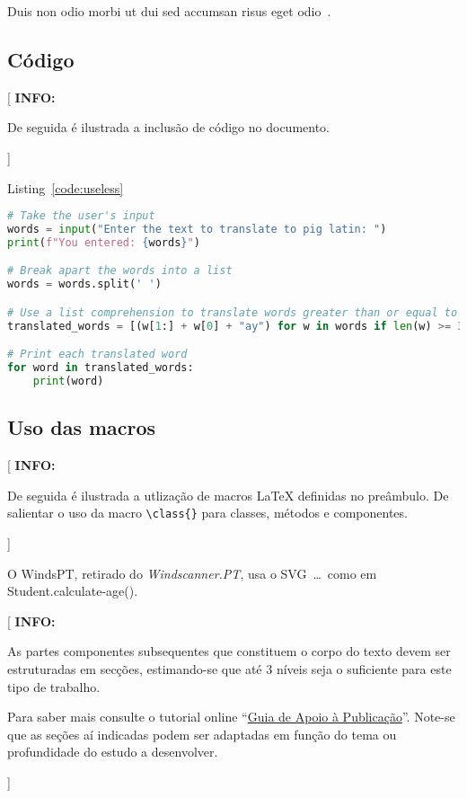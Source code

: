 \documentclass[11pt,a4paper]{report}
\newcommand{\windspt}{\textsf{WindsPT\/}}
\newcommand{\windscannerpt}{\emph{Windscanner.PT\/}}
\newcommand{\class}[1]{{\normalfont\sffamily #1\/}}
\newcommand{\svg}{\class{SVG}}
\newenvironment{info}[1]{\vspace*{6mm}\color{blue}[ \textbf{INFO:} \begin{em} #1}
                        {\vspace*{3mm}\end{em} ]}
\begin{document}
Duis non odio morbi ut dui sed accumsan risus eget odio~\cite{iso_19156_2011,ornelas2016}. 


\subsection*{Código}

\begin{info}
De seguida é ilustrada a inclusão de código no documento.
\end{info}

Listing~\ref{code:useless} 
\lipsum[8]

\begin{lstlisting}[language=Python, caption=Python example, label=code:useless]
# Take the user's input
words = input("Enter the text to translate to pig latin: ")
print(f"You entered: {words}")

# Break apart the words into a list
words = words.split(' ')

# Use a list comprehension to translate words greater than or equal to 3 characters
translated_words = [(w[1:] + w[0] + "ay") for w in words if len(w) >= 3 ]

# Print each translated word
for word in translated_words:
    print(word)
\end{lstlisting}

\subsection*{Uso das macros}

\begin{info}
De seguida é ilustrada a utlização de macros \LaTeX{} definidas no
preâmbulo.
De salientar o uso da macro \verb!\class{}! para classes, métodos e componentes.
\end{info}

O \windspt, retirado do \windscannerpt, usa o \svg\ \ldots\ como em \class{Student.calculate-age()}.

\lipsum[9]

\begin{info}
As partes componentes subsequentes que constituem o corpo do texto
devem ser estruturadas em secções, estimando-se que até 3 níveis seja
o suficiente para este tipo de trabalho.

Para saber mais consulte o tutorial online 
``\href{https://docs.google.com/document/d/1TDC1behVq8x7fQL4CcPEEh_np5GXviJevQxnQ9gbiJs/edit}
{Guia de Apoio à Publicação}''.
Note-se que as seções aí indicadas podem ser adaptadas em função do tema
ou profundidade do estudo a desenvolver.
\end{info}
\end{document}
